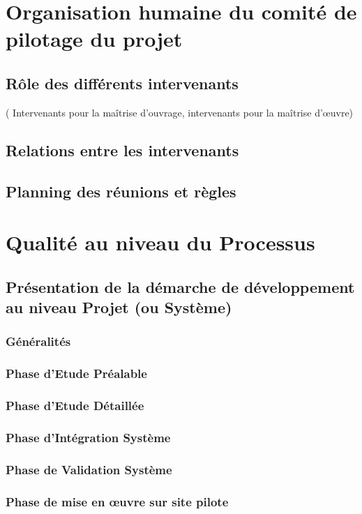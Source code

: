 \documentclass[a4paper]{article}
\begin{document}
\section{Organisation humaine du comité de pilotage du projet}
\subsection{Rôle des différents intervenants }
( Intervenants pour la maîtrise d'ouvrage, intervenants pour la maîtrise d'œuvre)
\subsection{Relations entre les intervenants}
\subsection{Planning des réunions et règles}

\section{Qualité au niveau du Processus}
\subsection{Présentation de la démarche de développement au niveau Projet (ou Système)}
\subsubsection{Généralités}
\subsubsection{Phase d'Etude Préalable}
\subsubsection{Phase d'Etude Détaillée}
\subsubsection{Phase d'Intégration Système}
\subsubsection{Phase de Validation Système}
\subsubsection{Phase de mise en œuvre sur site pilote}
\end{document}
